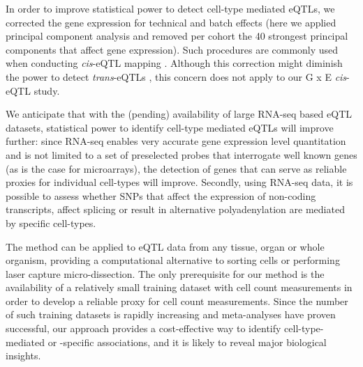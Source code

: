   In order to improve statistical power to detect cell-type mediated eQTLs, we corrected the gene 
  expression for technical and batch effects (here we applied principal component analysis and removed 
  per cohort the 40 strongest principal components that affect gene expression). Such procedures are 
  commonly used when conducting \emph{cis}-eQTL mapping \cite{Lude:2011, Dubois:2010, Fu:2012, 
  Zhernakova:2013, Westra:2013, Lappalainen:2013}. Although this correction might diminish the 
  power to detect \emph{trans}-eQTLs \cite{Westra:2013}, this concern does not apply to our G x E \emph{cis}-eQTL study.

  We anticipate that with the (pending) availability of large RNA-seq based eQTL datasets, statistical 
  power to identify cell-type mediated eQTLs will improve further: since RNA-seq enables very accurate 
  gene expression level quantitation and is not limited to a set of preselected probes that interrogate 
  well known genes (as is the case for microarrays), the detection of genes that can serve as reliable 
  proxies for individual cell-types will improve. Secondly, using RNA-seq data, it is possible to 
  assess whether SNPs that affect the expression of non-coding transcripts, affect splicing \cite{Lappalainen:2013} or result 
  in alternative polyadenylation \cite{Zhernakova:2013} are mediated by specific cell-types.

  The method can be applied to eQTL data from any tissue, organ or whole organism, providing a computational alternative to sorting cells 
  or performing laser capture micro-dissection. The only prerequisite for our method is the availability of a relatively small training 
  dataset with cell count measurements in order to develop a reliable proxy for cell count measurements. Since the number of such training 
  datasets is rapidly increasing and meta-analyses have proven successful\cite{Lude:2011, Westra:2013}, our approach provides a cost-effective way to identify 
  cell-type-mediated or -specific associations, and it is likely to reveal major biological insights.

